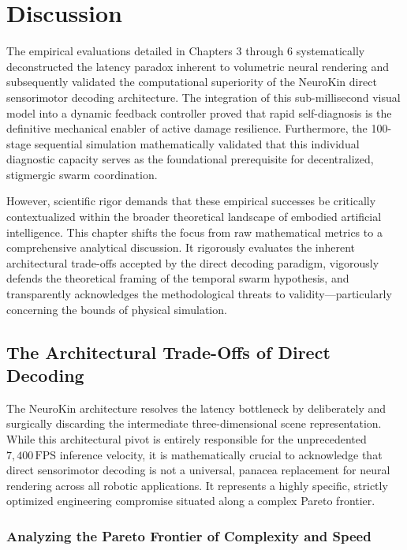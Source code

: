 \documentclass[12pt,a4paper,oneside]{report}
\begin{document}
\chapter{Discussion}

The empirical evaluations detailed in Chapters 3 through 6 systematically deconstructed the latency paradox inherent to volumetric neural rendering and subsequently validated the computational superiority of the NeuroKin direct sensorimotor decoding architecture. The integration of this sub-millisecond visual model into a dynamic feedback controller proved that rapid self-diagnosis is the definitive mechanical enabler of active damage resilience. Furthermore, the 100-stage sequential simulation mathematically validated that this individual diagnostic capacity serves as the foundational prerequisite for decentralized, stigmergic swarm coordination. 

However, scientific rigor demands that these empirical successes be critically contextualized within the broader theoretical landscape of embodied artificial intelligence. This chapter shifts the focus from raw mathematical metrics to a comprehensive analytical discussion. It rigorously evaluates the inherent architectural trade-offs accepted by the direct decoding paradigm, vigorously defends the theoretical framing of the temporal swarm hypothesis, and transparently acknowledges the methodological threats to validity—particularly concerning the bounds of physical simulation.

\section{The Architectural Trade-Offs of Direct Decoding}

The NeuroKin architecture resolves the latency bottleneck by deliberately and surgically discarding the intermediate three-dimensional scene representation. While this architectural pivot is entirely responsible for the unprecedented $7{,}400\,\mathrm{FPS}$ inference velocity, it is mathematically crucial to acknowledge that direct sensorimotor decoding is not a universal, panacea replacement for neural rendering across all robotic applications. It represents a highly specific, strictly optimized engineering compromise situated along a complex Pareto frontier.

\subsection{Analyzing the Pareto Frontier of Complexity and Speed}
\end{document}
